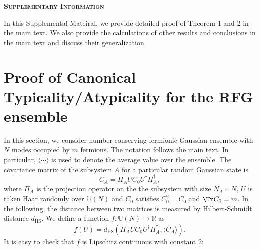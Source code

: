 \clearpage{}

\onecolumngrid
\renewcommand{\thefigure}{S\arabic{figure}}
\setcounter{figure}{0} 
\renewcommand{\thepage}{S\arabic{page}}
\setcounter{page}{1} 
\renewcommand{\theequation}{S.\arabic{equation}}
\setcounter{equation}{0} 
\setcounter{section}{0}

\begin{center}
\textbf{\textsc{\LARGE{}Supplementary Information}}{\LARGE\par}
\par\end{center}

\tableofcontents{}



In this Supplemental Mateiral, we provide detailed proof of Theorem 1 and 2 in the main text. We also provide the calculations of other results and conclusions in the main text and discuss their generalization.

\section{Proof of Canonical Typicality/Atypicality for the RFG ensemble}

In this section, we consider number conserving fermionic
Gaussian ensemble with $N$ modes occupied by $m$ fermions. The
notation follows the main text. In particular, %
$\langle\cdots\rangle$ is
used to denote the average value over the ensemble. The covariance
matrix of the subsystem $A$ for a particular random Gaussian state
is 
\begin{equation}
C_{A}=\Pi_{A}UC_{0}U^{\dagger}\Pi_{A}^{\dagger},
\end{equation}
where $\Pi_{A}$ is the projection operator on the the subsystem with size
$N_{A}\times N$, $U$ %
is taken Haar randomly over $\mathbb{U}(N)$ and
$C_{0}$ satisfies $C_{0}^{2}=C_{0}$ and $\Tr C_{0}=m$. In the following,
the distance between two matrices is measured by Hilbert-Schmidt distance
$d_{\mathrm{HS}}$. We define a function $f:\mathbb{U}(N)\to\mathbb{R}$
as
\begin{equation}
f(U)=d_{\mathrm{HS}}(\Pi_{A}UC_{0}U^{\dagger}\Pi_{A}^{\dagger},\langle C_{A}\rangle).
\end{equation}
It is easy to check that $f$ is Lipschitz continuous with constant
$2$:

